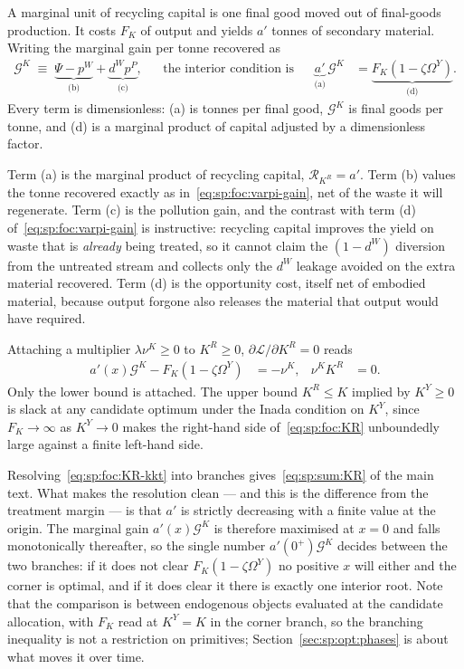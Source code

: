  A marginal unit of recycling capital is one final good moved out of final-goods production. It costs $F_K$ of output and yields $a'$ tonnes of secondary material. Writing the marginal gain per tonne recovered as
\begin{align}
\mathcal G^K \;\equiv\; \underbrace{\Psi-p^W}_{\text{(b)}}+\underbrace{d^Wp^P}_{\text{(c)}},
&&\text{the interior condition is}
&&
\underbrace{a'}_{\text{(a)}}\,\mathcal G^K &= \underbrace{F_K\left(1-\zeta\Omega^Y\right)}_{\text{(d)}} .
\label{eq:sp:foc:KR}
\end{align}
Every term is dimensionless: (a) is tonnes per final good, $\mathcal G^K$ is final goods per tonne, and (d) is a marginal product of capital adjusted by a dimensionless factor.

Term (a) is the marginal product of recycling capital, $\mathcal R_{K^R}=a'$. Term (b) values the tonne recovered exactly as in~\eqref{eq:sp:foc:varpi-gain}, net of the waste it will regenerate. Term (c) is the pollution gain, and the contrast with term (d) of~\eqref{eq:sp:foc:varpi-gain} is instructive: recycling capital improves the yield on waste that is \emph{already} being treated, so it cannot claim the $\left(1-d^W\right)$ diversion from the untreated stream and collects only the $d^W$ leakage avoided on the extra material recovered. Term (d) is the opportunity cost, itself net of embodied material, because output forgone also releases the material that output would have required.

 Attaching a multiplier $\lambda\nu^K\ge0$ to $K^R\ge0$,
$\partial\mathcal L/\partial K^R=0$ reads
\begin{align}
a'\!\left(x\right)\mathcal G^K-F_K\left(1-\zeta\Omega^Y\right) &= -\nu^K,
&
\nu^KK^R &= 0 .
\label{eq:sp:foc:KR-kkt}
\end{align}
Only the lower bound is attached. The upper bound $K^R\le K$ implied by $K^Y\ge0$ is
slack at any candidate optimum under the Inada condition on $K^Y$, since $F_K\to\infty$ as
$K^Y\to0$ makes the right-hand side of~\eqref{eq:sp:foc:KR} unboundedly large against a finite left-hand
side.

Resolving~\eqref{eq:sp:foc:KR-kkt} into branches gives~\eqref{eq:sp:sum:KR} of the main text. What
makes the resolution clean --- and this is the difference from the treatment margin --- is that
$a'$ is strictly decreasing with a finite value at the origin. The marginal gain
$a'\!\left(x\right)\mathcal G^K$ is therefore maximised at $x=0$ and falls monotonically thereafter,
so the single number $a'\!\left(0^+\right)\mathcal G^K$ decides between the two branches: if it does
not clear $F_K\left(1-\zeta\Omega^Y\right)$ no positive $x$ will either and the corner is optimal,
and if it does clear it there is exactly one interior root. Note that the comparison is between
endogenous objects evaluated at the candidate allocation, with $F_K$ read at $K^Y=K$ in the corner
branch, so the branching inequality is not a restriction on primitives;
Section~\ref{sec:sp:opt:phases} is about what moves it over time.

